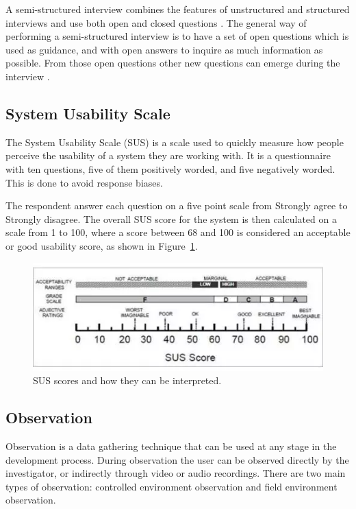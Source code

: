 \documentclass[../Main/thesis.tex]{subfiles}
\begin{document}
A semi-structured interview combines the features of unstructured and structured interviews and use both open and closed questions \citep{Preece2011}.
The general way of performing a semi-structured interview is to have a set of open questions which is used as guidance, and with open answers to inquire as much information as possible.
From those open questions other new questions can emerge during the interview \citep{DiCicco-Bloom2006}.

\subsection{System Usability Scale}
The System Usability Scale (SUS) is a scale used to quickly measure how people perceive the usability of a system they are working with\citep{Brooke2013}.
It is a questionnaire with ten questions, five of them positively worded, and five negatively worded.
This is done to avoid response biases\citep{Brooke2013}.

The respondent answer each question on a five point scale from Strongly agree to Strongly disagree\citep{AssistantSecretaryforPublicAffairs2013}.
The overall SUS score for the system is then calculated on a scale from 1 to 100, where a score between 68 and 100 is considered an acceptable or good usability score, as shown in Figure~\ref{fig:sus-score}\citep{AssistantSecretaryforPublicAffairs2013}.

\begin{figure}[h]
	\centering
	\includegraphics[width=\textwidth]{../fig/sus-score}
	\caption[SUS scores and how they can be interpreted]{SUS scores and how they can be interpreted\citep{Brooke2013}.}
	\label{fig:sus-score}
\end{figure}

\subsection{Observation}
Observation is a data gathering technique that can be used at any stage in the development process.
During observation the user can be observed directly by the investigator, or indirectly through video or audio recordings.
There are two main types of observation: controlled environment observation and field environment observation\citep{Preece2011}.
\end{document}
